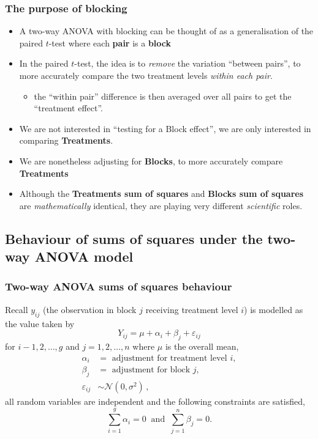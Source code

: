 \documentclass[a4paper]{article}
\begin{document}
\subsubsection{The purpose of blocking}
\begin{itemize}
	\item A two-way ANOVA with blocking can be thought of as a generalisation of the paired \( t \)-test where each \textbf{pair} is a \textbf{block}
	\item In the paired \( t \)-test, the idea is to \textit{remove} the variation ``between pairs'', to more accurately compare the two treatment levels \textit{within each pair}.
	\begin{itemize}
		\item the ``within pair'' difference is then averaged over all pairs to get the ``treatment effect''.
	\end{itemize}
	\item We are not interested in ``testing for a Block effect'', we are only interested in comparing \textcolor{mygreen}{\textbf{Treatments}}.
	\item We are nonetheless adjusting for \textcolor{myred}{\textbf{Blocks}}, to more accurately compare \textcolor{mygreen}{\textbf{Treatments}}
	\item Although the \textcolor{mygreen}{\textbf{Treatments sum of squares}} and \textcolor{myred}{\textbf{Blocks sum of squares}} are \textit{mathematically} identical, they are playing very different \textit{scientific} roles.
\end{itemize}
\subsection{Behaviour of sums of squares under the two-way ANOVA model}
\subsubsection{Two-way ANOVA sums of squares behaviour}
Recall \( y_{ij} \) (the observation in block \( j \) receiving treatment level \( i \)) is modelled as the value taken by
\[
	Y_{ij} = \mu + \alpha_i + \beta_j + \varepsilon_{ij}
\]
for \( i-1,2,\dotsc,g \) and \( j = 1,2,\dotsc,n \) where \( \mu \) is the overall mean,
\begin{align*}
	\alpha_i & = \text{ adjustment for treatment level } i,\\
	\beta_{j} & = \text{ adjustment for block }j, \\
	\varepsilon_{ij} & \sim {\mathcal N}(0,\sigma^2)\,,
\end{align*}
all random variables are independent and the following constraints are satisfied,
\[
	\sum_{i=1}^g\alpha_i = 0\ \text{ and } \ \sum_{j=1}^n\beta_j=0.
\]
\end{document}
